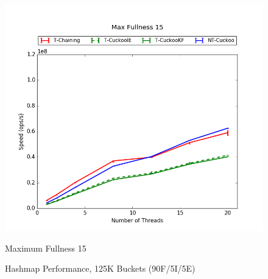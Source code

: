 \begin{figure}[H]
\begin{minipage}{0.45\textwidth}
    \end{minipage}
	\begin{minipage}{0.45\textwidth}\includegraphics[width=\textwidth]{maps/15HM1M:F90,I5,E5.png} 
        \caption*{Maximum Fullness 15}
    \end{minipage}
	\caption{Hashmap Performance, 125K Buckets (90F/5I/5E)}
\end{figure}

